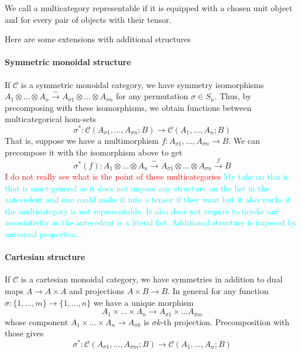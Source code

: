 \documentclass[acmsmall,screen, nonacm, anonymous]{acmart}
\begin{document}
We call a multicategory representable if it is equipped with a chosen unit object and for every pair of objects with their tensor.

Here are some extensions with additional structures

\paragraph*{Symmetric monoidal structure} If $\mathcal{C}$ is a symmetric monoidal category, we have symmetry isomorphisms $A_1 \otimes \ldots \otimes A_n \xrightarrow{\sim} A_{\sigma 1} \otimes \ldots \otimes A_{\sigma n}$ for any permutation $\sigma \in S_{n}$.
Thus, by precomposing with these isomorphisms, we obtain functions between multicategorical hom-sets
\[
\sigma^* : \mathcal{C}(A_{\sigma 1}, \ldots, A_{\sigma n}; B) \to \mathcal{C}(A_1,\ldots,A_n;B)
\]
That is, suppose we have a multimorphism $f : A_{\sigma 1}, \ldots, A_{\sigma n} \to B$. We can precompose it with the isomorphism above to get
\[
\sigma^{*}(f) : A_1 \otimes \ldots \otimes A_n \xrightarrow{\sim} A_{\sigma 1} \otimes \ldots \otimes A_{\sigma n} \xrightarrow{f} B
\]
\textcolor{red}{I do not really see what is the point of these multicategories}
\textcolor{cyan}{My take on this is that is more general as it does not impose any structure on the list in the antecedent and one could make it into a tensor if they want but it also works if the multicategory is not representable.
It also does not require to invoke any associativity as the antecedent is a literal list.
Additional structure is imposed by universal properties.
}
\paragraph*{Cartesian structure} If $\mathcal{C}$ is a cartesian monoidal category, we have symmetries in addition to dual maps $A \to A \times A$ and projections $A \times B \to B$.
In general for any function $\sigma : \{1, \ldots, m\} \to \{1, \ldots, n\}$ we have a unique morphism
\[
A_1 \times \ldots \times A_n \to A_{\sigma 1} \times \ldots A_{\sigma m}
\]
whose component $A_1 \times \ldots \times A_n \to A_{\sigma k}$ is $\sigma k$-th projection.
Precomposition with those gives
\[
\sigma^{*} : \mathcal{C}(A_{\sigma 1}, \ldots, A_{\sigma m}; B) \to \mathcal{C}(A_{1}, \ldots, A_n; B)
\] 
\end{document}
